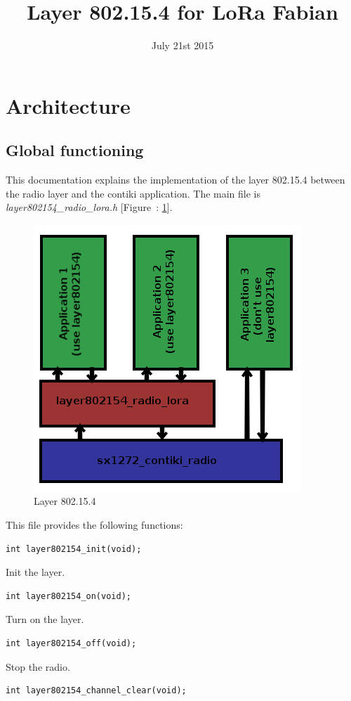 \documentclass{article}
\title{Layer 802.15.4 for LoRa Fabian}
\date{July 21st 2015}
\begin{document}
\maketitle
\section{Architecture}
\subsection{Global functioning}
This documentation explains the implementation of the layer 802.15.4 between the radio layer and the contiki application. The main file is \emph{layer802154\_radio\_lora.h} [Figure~: \ref{fig:architecture}].\\
\begin{figure}[h]
	\begin{center}
		\includegraphics[scale=0.5]{img/archi}
		\caption{Layer 802.15.4}
		\label{fig:architecture}
	\end{center}
\end{figure}
This file provides the following functions:
\begin{verbatim}
int layer802154_init(void);
\end{verbatim}
Init the layer.
\begin{verbatim}
int layer802154_on(void);
\end{verbatim}
Turn on the layer.
\begin{verbatim}
int layer802154_off(void);
\end{verbatim}
Stop the radio.
\begin{verbatim}
int layer802154_channel_clear(void);
\end{verbatim}
\end{document}
